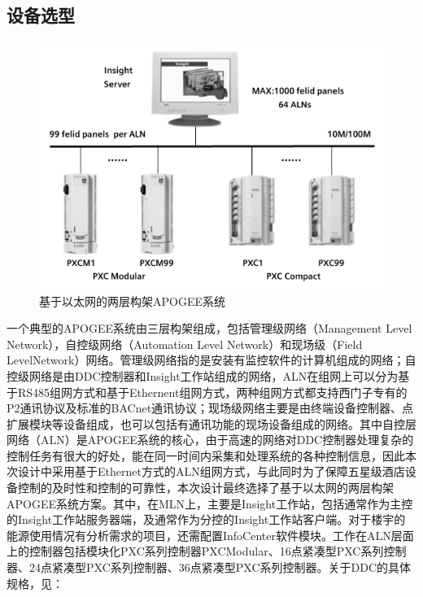 \documentclass{gdutart}
\begin{document}
    \subsection{设备选型}

    \begin{figure}[htpb]
      \begin{center}
        \includegraphics[scale=0.25]{img/framework.png}
      \end{center}
      \caption{基于以太网的两层构架APOGEE系统}\label{fig:fig1}
    \end{figure}

    一个典型的APOGEE系统由三层构架组成，包括管理级网络（Management Level Network），自控级网络（Automation Level Network）和现场级（Field LevelNetwork）网络。管理级网络指的是安装有监控软件的计算机组成的网络；自控级网络是由DDC控制器和Insight工作站组成的网络，ALN在组网上可以分为基于RS485组网方式和基于Ethernent组网方式，两种组网方式都支持西门子专有的P2通讯协议及标准的BACnet通讯协议；现场级网络主要是由终端设备控制器、点扩展模块等设备组成，也可以包括有通讯功能的现场设备组成的网络。其中自控层网络（ALN）是APOGEE系统的核心，由于高速的网络对DDC控制器处理复杂的控制任务有很大的好处，能在同一时间内采集和处理系统的各种控制信息，因此本次设计中采用基于Ethernet方式的ALN组网方式，与此同时为了保障五星级酒店设备控制的及时性和控制的可靠性，本次设计最终选择了基于以太网的两层构架APOGEE系统方案。其中，在MLN上，主要是Insight工作站，包括通常作为主控的Insight工作站服务器端，及通常作为分控的Insight工作站客户端。对于楼宇的能源使用情况有分析需求的项目，还需配置InfoCenter软件模块。工作在ALN层面上的控制器包括模块化PXC系列控制器PXCModular、16点紧凑型PXC系列控制器、24点紧凑型PXC系列控制器、36点紧凑型PXC系列控制器。关于DDC的具体规格，见：
\end{document}

